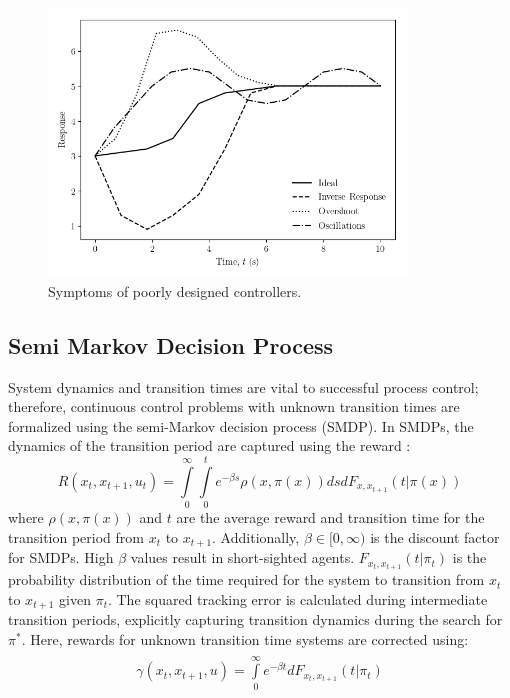 \begin{figure}[H]
    \begin{center}
        \includegraphics[width=9.5cm]{images/ftc/inv_overshoot_pid.png}
        \caption{\label{fig:inv_overshoot_pid} Symptoms of poorly designed controllers.}
    \end{center}
\end{figure}

\subsection{Semi Markov Decision Process}
System dynamics and transition times are vital to successful process control; therefore, continuous control problems with unknown transition times are formalized using the semi-Markov decision process (SMDP). In SMDPs, the dynamics of the transition period are captured using the reward \cite{continuous_rl_ref14}:
\begin{equation}
R(x_t, x_{t+1}, u_t) = \int\limits^\infty_0 \int\limits^t_0 e^{-\beta s} \rho(x, \pi (x))dsdF_{x, x_{t+1}}(t | \pi (x))
\label{eq:reward_rate}
\end{equation}
where $\rho(x, \pi (x))$ and $t$ are the average reward and transition time for the transition period from $x_t$ to $x_{t+1}$. Additionally, $\beta \in [0, \infty)$ is the discount factor for SMDPs.  High $\beta$ values result in short-sighted agents. $F_{x_t, x_{t+1}}(t | \pi_t)$ is the probability distribution of the time required for the system to transition from $x_t$ to $x_{t+1}$ given $\pi_t$.  The squared tracking error is calculated during intermediate transition periods, explicitly capturing transition dynamics during the search for $\pi^*$. Here, rewards for unknown transition time systems are corrected using:
\begin{eqnarray}
\begin{array}{rcl}
\gamma(x_t, x_{t+1}, u) = \int\limits^{\infty}_0 e^{-\beta t} dF_{x_t, x_{t+1}}(t | \pi_t)
\end{array}
\label{eq:discount_factor}
\end{eqnarray}

